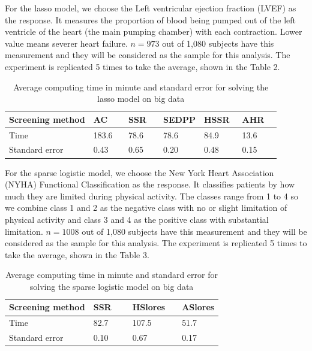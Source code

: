 For the lasso model, we choose the Left ventricular ejection fraction (LVEF) as the response. It measures the proportion of blood being pumped out of the left ventricle of the heart (the main pumping chamber) with each contraction. Lower value means severer heart failure. $n=973$ out of 1,080 subjects have this measurement and they will be considered as the sample for this analysis. The experiment is replicated 5 times to take the average, shown in the Table 2.

\begin{table}[H]
\centering
\begin{tabular}{l|l|l|l|l|l}
\hline

Screening method & AC\,\,\,\,\,\,\,\,\,    & SSR\,\,\,\,\,\,   & SEDPP & HSSR\,\,\,  & AHR\,\,\,\,\,\,  \\
\hline
Time & 183.6 & 78.6 & 78.6 & 84.9 & 13.6\\
Standard error & 0.43 & 0.65 & 0.20 & 0.48 & 0.15
 \\\hline
\end{tabular}
\caption{Average computing time in minute and standard error for solving the lasso model on big data}
\end{table}

For the sparse logistic model, we choose the New York Heart Association (NYHA) Functional Classification as the response. It classifies patients by how much they are limited during physical activity. The classes range from 1 to 4 so we combine class 1 and 2 as the negative class with no or slight limitation of physical activity and class 3 and 4 as the positive class with substantial limitation. $n=1008$ out of 1,080 subjects have this measurement and they will be considered as the sample for this analysis. The experiment is replicated 5 times to take the average, shown in the Table 3.

\begin{table}[H]
\centering
\begin{tabular}{l|l|l|l}
\hline

Screening method & SSR\,\,\,\,\,\,\,\,\,    & HSlores\,\,\,\,\,\,   & ASlores   \\
\hline
Time & 82.7 & 107.5 & 51.7 \\
Standard error & 0.10 & 0.67 & 0.17 
 \\\hline
\end{tabular}
\caption{Average computing time in minute and standard error for solving the sparse logistic model on big data}
\end{table}

